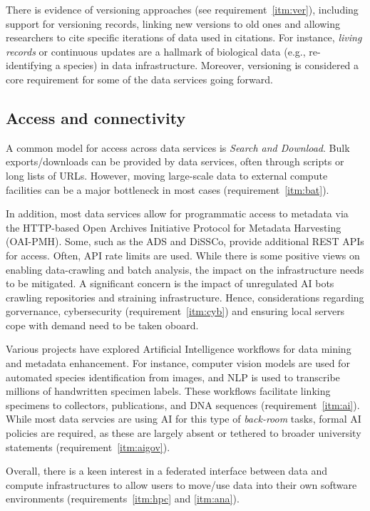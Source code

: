 \documentclass[11pt]{scrartcl}
\begin{document}
There is evidence of versioning approaches (see requirement~\ref{itm:ver}), including support for  versioning  records, linking new versions to old ones and allowing researchers to cite specific iterations of data used in citations. For instance, \emph{living records} or continuous updates are a hallmark of biological data (e.g., re-identifying  a species) in data infrastructure.  Moreover, versioning is considered a core requirement for some of the data services going forward.


\subsection{Access and connectivity}
A common model for access across data services is \emph{Search and Download}. Bulk exports/downloads can be provided by data services, often through scripts or long lists of URLs. 
However, moving large-scale data to external compute facilities can be a major bottleneck in most cases (requirement~\ref{itm:bat}).

In addition, most data services allow for programmatic access to metadata via the HTTP-based Open Archives Initiative Protocol for Metadata Harvesting (OAI-PMH). Some, such as the ADS and DiSSCo, provide additional REST APIs for access. Often, API rate limits are used. While there is some positive views on enabling data-crawling and batch analysis, the impact on the infrastructure needs to be mitigated. A significant concern is the impact of unregulated AI bots crawling repositories and straining infrastructure. Hence, considerations regarding gorvernance, cybersecurity (requirement~\ref{itm:cyb}) and ensuring local servers cope with demand need to be taken oboard.

Various projects have explored Artificial Intelligence workflows for data mining and metadata enhancement. 
For instance, computer vision models are used for automated species identification from images, and NLP is used to transcribe millions of handwritten specimen labels. These workflows facilitate linking specimens to collectors, publications, and DNA sequences (requirement~\ref{itm:ai}). While most data servcies are using AI for this type of \emph{back-room} tasks, formal AI policies are required, as these are largely absent or tethered to broader university statements (requirement~\ref{itm:aigov}). 

Overall, there is a keen interest in a federated interface between data and compute infrastructures to allow users to move/use data into their own software environments (requirements~\ref{itm:hpc} and \ref{itm:ana}). 
\end{document}
